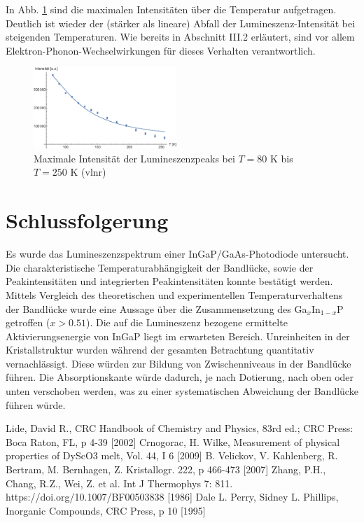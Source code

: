 \documentclass[aps,twocolumn,secnumarabic,nobalancelastpage,amsmath,amssymb,
nofootinbib,superscriptaddress]{revtex4-1}
\begin{document}
In Abb. \ref{fig:maxInt} sind die maximalen Intensitäten über die Temperatur aufgetragen. Deutlich ist wieder
der (stärker als lineare) Abfall der Lumineszenz-Intensität bei steigenden Temperaturen. Wie bereits in Abschnitt III.2 erläutert,
sind vor allem Elektron-Phonon-Wechselwirkungen für dieses Verhalten verantwortlich.

\begin{figure}[t]
  \centering
  \includegraphics[width=0.48\textwidth]{../Messung/maxintenstempfit.eps}
  \caption{\label{fig:maxInt}Maximale Intensität der Lumineszenzpeaks bei $T=80\text{ K}$ bis $T=250\text{ K}$ (vlnr)}
\end{figure}

\section{Schlussfolgerung}

\noindent Es wurde das Lumineszenzspektrum einer InGaP/GaAs-Photodiode untersucht. Die charakteristische Temperaturabhängigkeit der
Bandlücke, sowie der Peakintensitäten und integrierten Peakintensitäten konnte bestätigt werden. Mittels Vergleich des theoretischen
und experimentellen Temperaturverhaltens der Bandlücke wurde eine Aussage über die Zusammensetzung des Ga$_x$In$_{1-x}$P getroffen
($x>0.51$). Die auf die Lumineszenz bezogene ermittelte Aktivierungsenergie von InGaP liegt im erwarteten Bereich.
Unreinheiten in der Kristallstruktur wurden während der gesamten Betrachtung quantitativ vernachlässigt. Diese würden zur Bildung
von Zwischenniveaus in der Bandlücke führen. Die Absorptionskante würde dadurch, je nach Dotierung, nach oben oder unten verschoben werden, was
zu einer systematischen Abweichung der Bandlücke führen würde.



\begin{thebibliography}{99}
Lide, David R., CRC Handbook of Chemistry and Physics, 83rd ed.; CRC Press: Boca Raton, FL, p 4-39 [2002]
Crnogorac, H. Wilke, Measurement of physical properties of DyScO3 melt, Vol. 44, I 6 [2009]
B. Velickov, V. Kahlenberg, R. Bertram, M. Bernhagen, Z. Kristallogr. 222, p 466-473 [2007]
Zhang, P.H., Chang, R.Z., Wei, Z. et al. Int J Thermophys 7: 811. https://doi.org/10.1007/BF00503838 [1986]
Dale L. Perry, Sidney L. Phillips, Inorganic Compounds, CRC Press, p 10 [1995]
\end{thebibliography}


\clearpage
\appendix
\end{document}
